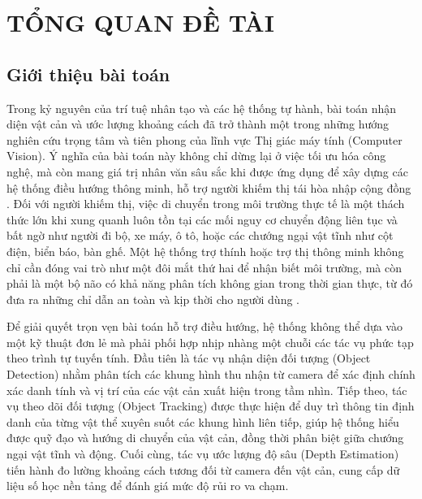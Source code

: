 
\chapter{TỔNG QUAN ĐỀ TÀI} %

\label{Chapter1} %


\newcommand{\keyword}[1]{\textbf{#1}}
\newcommand{\tabhead}[1]{\textbf{#1}}
\newcommand{\code}[1]{\texttt{#1}}
\newcommand{\file}[1]{\texttt{\bfseries#1}}
\newcommand{\option}[1]{\texttt{\itshape#1}}


\section{Giới thiệu bài toán}

Trong kỷ nguyên của trí tuệ nhân tạo và các hệ thống tự hành, bài toán nhận diện vật cản và ước lượng khoảng cách đã trở thành một trong những hướng nghiên cứu trọng tâm và tiên phong của lĩnh vực Thị giác máy tính (Computer Vision). Ý nghĩa của bài toán này không chỉ dừng lại ở việc tối ưu hóa công nghệ, mà còn mang giá trị nhân văn sâu sắc khi được ứng dụng để xây dựng các hệ thống điều hướng thông minh, hỗ trợ người khiếm thị tái hòa nhập cộng đồng \cite{Reference1}. Đối với người khiếm thị, việc di chuyển trong môi trường thực tế là một thách thức lớn khi xung quanh luôn tồn tại các mối nguy cơ chuyển động liên tục và bất ngờ như người đi bộ, xe máy, ô tô, hoặc các chướng ngại vật tĩnh như cột điện, biển báo, bàn ghế. Một hệ thống trợ thính hoặc trợ thị thông minh không chỉ cần đóng vai trò như một đôi mắt thứ hai để nhận biết môi trường, mà còn phải là một bộ não có khả năng phân tích không gian trong thời gian thực, từ đó đưa ra những chỉ dẫn an toàn và kịp thời cho người dùng \cite{Reference2}.

Để giải quyết trọn vẹn bài toán hỗ trợ điều hướng, hệ thống không thể dựa vào một kỹ thuật đơn lẻ mà phải phối hợp nhịp nhàng một chuỗi các tác vụ phức tạp theo trình tự tuyến tính. Đầu tiên là tác vụ nhận diện đối tượng (Object Detection) nhằm phân tích các khung hình thu nhận từ camera để xác định chính xác danh tính và vị trí của các vật cản xuất hiện trong tầm nhìn. Tiếp theo, tác vụ theo dõi đối tượng (Object Tracking) được thực hiện để duy trì thông tin định danh của từng vật thể xuyên suốt các khung hình liên tiếp, giúp hệ thống hiểu được quỹ đạo và hướng di chuyển của vật cản, đồng thời phân biệt giữa chướng ngại vật tĩnh và động. Cuối cùng, tác vụ ước lượng độ sâu (Depth Estimation) tiến hành đo lường khoảng cách tương đối từ camera đến vật cản, cung cấp dữ liệu số học nền tảng để đánh giá mức độ rủi ro va chạm.

